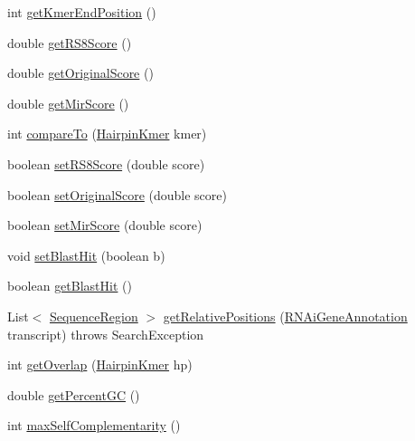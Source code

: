 \begin{DoxyCompactItemize}
\item 
int \hyperlink{classbroad_1_1core_1_1primer3_1_1_hairpin_kmer_a698c1efd7c65b2a97fb22ee4ce3e8ba3}{get\+Kmer\+End\+Position} ()
\item 
double \hyperlink{classbroad_1_1core_1_1primer3_1_1_hairpin_kmer_a41cdc00d4ed4473e37c7ee28020e6680}{get\+R\+S8\+Score} ()
\item 
double \hyperlink{classbroad_1_1core_1_1primer3_1_1_hairpin_kmer_ab743db5421aed53935c4bc5ff9183012}{get\+Original\+Score} ()
\item 
double \hyperlink{classbroad_1_1core_1_1primer3_1_1_hairpin_kmer_ab176e0652dfb5364e98aa377c38789b1}{get\+Mir\+Score} ()
\item 
int \hyperlink{classbroad_1_1core_1_1primer3_1_1_hairpin_kmer_a94a68e49d68979288bb6eb0ef8d8984b}{compare\+To} (\hyperlink{classbroad_1_1core_1_1primer3_1_1_hairpin_kmer}{Hairpin\+Kmer} kmer)
\item 
boolean \hyperlink{classbroad_1_1core_1_1primer3_1_1_hairpin_kmer_a6c5ce386d481e633b2d010ea8585b6c5}{set\+R\+S8\+Score} (double score)
\item 
boolean \hyperlink{classbroad_1_1core_1_1primer3_1_1_hairpin_kmer_a294ae5418fc2bd6cbbeb105147e0c157}{set\+Original\+Score} (double score)
\item 
boolean \hyperlink{classbroad_1_1core_1_1primer3_1_1_hairpin_kmer_a7c4b98cf635f1314ad769248e0aaa1bd}{set\+Mir\+Score} (double score)
\item 
void \hyperlink{classbroad_1_1core_1_1primer3_1_1_hairpin_kmer_a3df2b6875a5496c8447a3f389d173d7a}{set\+Blast\+Hit} (boolean b)
\item 
boolean \hyperlink{classbroad_1_1core_1_1primer3_1_1_hairpin_kmer_a6137c907877131fdc99e2ac9e29d5c57}{get\+Blast\+Hit} ()
\item 
List$<$ \hyperlink{classbroad_1_1core_1_1sequence_1_1_sequence_region}{Sequence\+Region} $>$ \hyperlink{classbroad_1_1core_1_1primer3_1_1_hairpin_kmer_a78a3c96c2b34cc37b558f390512a074c}{get\+Relative\+Positions} (\hyperlink{classbroad_1_1pda_1_1rnai_1_1_r_n_ai_gene_annotation}{R\+N\+Ai\+Gene\+Annotation} transcript)  throws Search\+Exception 
\item 
int \hyperlink{classbroad_1_1core_1_1primer3_1_1_hairpin_kmer_ae6410252588bf4ba7a0d87f866ee9b4c}{get\+Overlap} (\hyperlink{classbroad_1_1core_1_1primer3_1_1_hairpin_kmer}{Hairpin\+Kmer} hp)
\item 
double \hyperlink{classbroad_1_1core_1_1primer3_1_1_hairpin_kmer_a1fc153d6348e1a2f959d230b005c3f04}{get\+Percent\+G\+C} ()
\item 
int \hyperlink{classbroad_1_1core_1_1primer3_1_1_hairpin_kmer_ada34732d5709df1afba5b4064bd0353a}{max\+Self\+Complementarity} ()
\end{DoxyCompactItemize}


